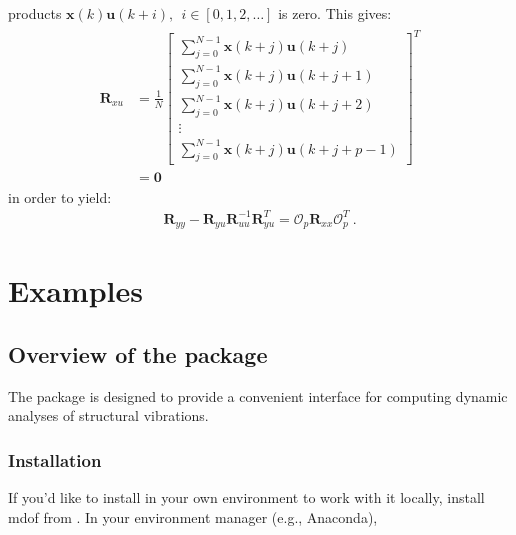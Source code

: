 \documentclass[letterpaper,10pt,english]{sphinxmanual}
\let\sphinxpxdimen\pdfpxdimen\else\newdimen\sphinxpxdimen
\begin{document}
products \(\bm{x}(k)\bm{u}(k+i), ~~ i \in [0,1,2,\dots]\) is
zero. This gives:
\begin{equation*}
\begin{split}\begin{aligned}
\bm{R}_{xu} &=
\frac{1}{N}
\begin{bmatrix}
\sum_{j=0}^{N-1}\bm{x}(k+j)\bm{u}(k+j) \\
\sum_{j=0}^{N-1}\bm{x}(k+j)\bm{u}(k+j+1) \\
\sum_{j=0}^{N-1}\bm{x}(k+j)\bm{u}(k+j+2) \\
\vdots \\
\sum_{j=0}^{N-1}\bm{x}(k+j)\bm{u}(k+j+p-1)
\end{bmatrix}^{T} \\
&=
\bm{0}
\end{aligned}\end{split}
\end{equation*}
\sphinxAtStartPar
in order to yield:
\begin{equation*}
\begin{split}\bm{R}_{yy} - \bm{R}_{yu}\bm{R}_{uu}^{-1}\bm{R}_{yu}^{T} = \mathcal{O}_{p}\bm{R}_{xx}\mathcal{O}_{p}^{T}~.\end{split}
\end{equation*}
\sphinxstepscope


\chapter{Examples}
\label{\detokenize{examples/index:examples}}\label{\detokenize{examples/index::doc}}
\sphinxstepscope


\section{Overview of the  package}
\label{\detokenize{examples/00_Overview:Overview-of-the-mdof-package}}\label{\detokenize{examples/00_Overview::doc}}


\sphinxAtStartPar
\sphinxincludegraphics[width=200\sphinxpxdimen]{{mdof_overview}.png}



\sphinxAtStartPar
The  package is designed to provide a convenient interface for computing dynamic analyses of structural vibrations.


\subsection{Installation}
\label{\detokenize{examples/00_Overview:Installation}}
\sphinxAtStartPar
If you’d like to install  in your own environment to work with it locally, install mdof from . In your environment manager (e.g., Anaconda),
\end{document}
